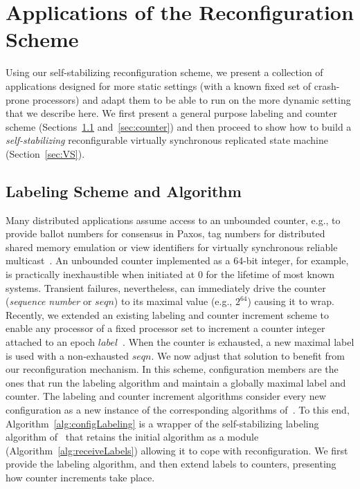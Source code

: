 \documentclass[11pt]{article}
\begin{document}
\section{Applications of the Reconfiguration Scheme}
\label{sec:labelCounter}
Using our self-stabilizing reconfiguration scheme, we present a collection of applications designed for more static settings (with a known fixed set of crash-prone processors) and adapt them to be able to run on the more dynamic setting that we describe here.
We first present a general purpose labeling and counter scheme (Sections~\ref{sec:label} and~\ref{sec:counter}) and then proceed to show how to build a  \emph{self-stabilizing} reconfigurable virtually synchronous replicated state machine (Section~\ref{sec:VS}). 





\subsection{Labeling Scheme and Algorithm}
\label{sec:label}
Many distributed applications assume access to an unbounded counter, e.g., to provide ballot numbers for consensus in Paxos, tag numbers for distributed shared memory emulation or view identifiers for virtually synchronous reliable multicast~\cite{SSVS}.
An unbounded counter implemented as a 64-bit integer, for example, is practically inexhaustible when initiated at 0 for the lifetime of most known systems.
Transient failures, nevertheless, can immediately drive the counter (\emph{sequence number} or $seqn$) to its maximal value (e.g., $2^{64}$) causing it to wrap. 
Recently, we extended an existing labeling and counter increment scheme to enable any processor of a fixed processor set to increment a counter integer attached to an epoch $label$~\cite{SSVS}.
When the counter is exhausted, a new maximal label is used with a non-exhausted $seqn$. 
We now adjust that solution to benefit from our reconfiguration mechanism. 
In this scheme, configuration members are the ones that run the labeling algorithm and maintain a globally maximal label and counter.
The labeling and counter increment algorithms consider every new configuration as a new instance of the corresponding algorithms of~\cite{SSVS}.
To this end, Algorithm~\ref{alg:configLabeling} is a wrapper of the self-stabilizing labeling algorithm of~\cite{SSVS} that retains the initial algorithm as a module (Algorithm~\ref{alg:receiveLabels}) allowing it to cope with reconfiguration. 
We first provide the labeling algorithm, and then extend labels to counters, presenting how counter increments take place.
\end{document}
